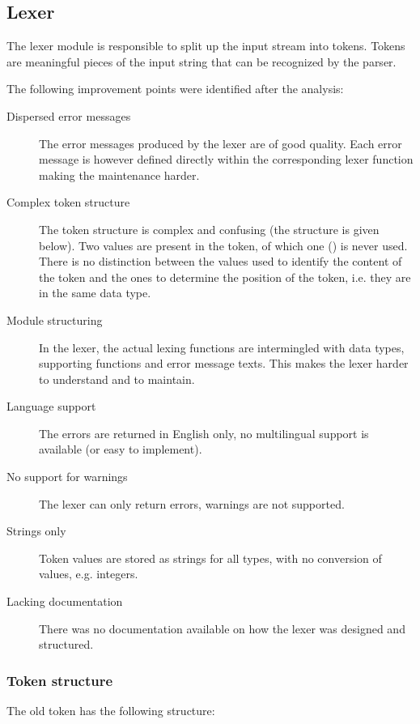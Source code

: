 
\subsection{Lexer}
\label{analysis:lexer}
The lexer module is responsible to split up the input stream into tokens.
Tokens are meaningful pieces of the input string that can be recognized by the parser.

The following improvement points were identified after the analysis:
\begin{description}
  \item[Dispersed error messages]
    The error messages produced by the lexer are of good quality.
    Each error message is however defined directly within the corresponding lexer function making the maintenance harder.
  \item[Complex token structure]
    The token structure is complex and confusing (the structure is given below).
    Two values are present in the token, of which one () is never used.
    There is no distinction between the values used to identify the content of the token and the ones to determine the position of the token, i.e. they are in the same data type.
  \item[Module structuring]
    In the lexer, the actual lexing functions are intermingled with data types, supporting functions and error message texts.
    This makes the lexer harder to understand and to maintain.
  \item[Language support]
    The errors are returned in English only, no multilingual support is available (or easy to implement).
  \item[No support for warnings]
    The lexer can only return errors, warnings are not supported.
  \item[Strings only]
    Token values are stored as strings for all types, with no conversion of values, e.g. integers.
  \item[Lacking documentation]
    There was no documentation available on how the lexer was designed and structured.
\end{description}

\subsubsection{Token structure}
\label{lexer-token}
The old token has the following structure:

